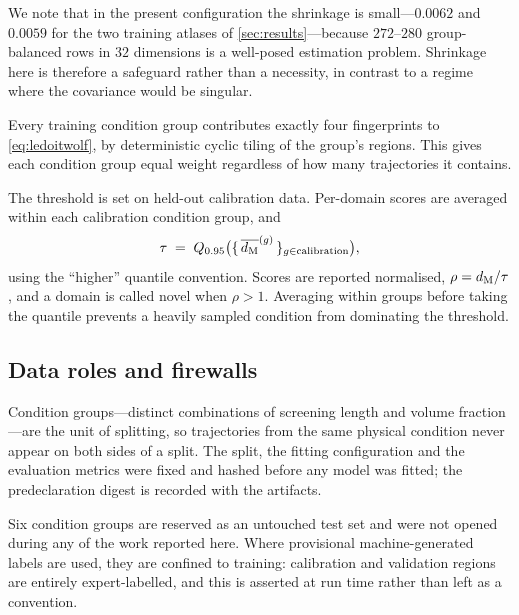 We note that in the present configuration the shrinkage is small---$0.0062$ and $0.0059$ for
the two training atlases of \cref{sec:results}---because $272$--$280$ group-balanced rows in
$32$ dimensions is a well-posed estimation problem. Shrinkage here is therefore a safeguard
rather than a necessity, in contrast to a regime where the covariance would be singular.

Every training condition group contributes exactly four fingerprints to \cref{eq:ledoitwolf},
by deterministic cyclic tiling of the group's regions. This gives each condition group equal
weight regardless of how many trajectories it contains.

The threshold is set on held-out calibration data. Per-domain scores are averaged within each
calibration condition group, and
\begin{equation}
  \tau \;=\; Q_{0.95}\bigl(\{\,\overline{d_{\mathrm{M}}}^{(g)}\,\}_{g \in \mathrm{calibration}}\bigr),
  \label{eq:threshold}
\end{equation}
using the ``higher'' quantile convention. Scores are reported normalised,
$\rho = d_{\mathrm{M}}/\tau$, and a domain is called novel when $\rho > 1$. Averaging within groups
before taking the quantile prevents a heavily sampled condition from dominating the
threshold.

\subsection{Data roles and firewalls}
\label{sec:splits}

Condition groups---distinct combinations of screening length and volume fraction---are the
unit of splitting, so trajectories from the same physical condition never appear on both
sides of a split. The split, the fitting configuration and the evaluation metrics were fixed
and hashed before any model was fitted; the predeclaration digest is recorded with the
artifacts.

Six condition groups are reserved as an untouched test set and were not opened during any
of the work reported here. Where provisional machine-generated labels are used, they are
confined to training: calibration and validation regions are entirely expert-labelled, and
this is asserted at run time rather than left as a convention.

